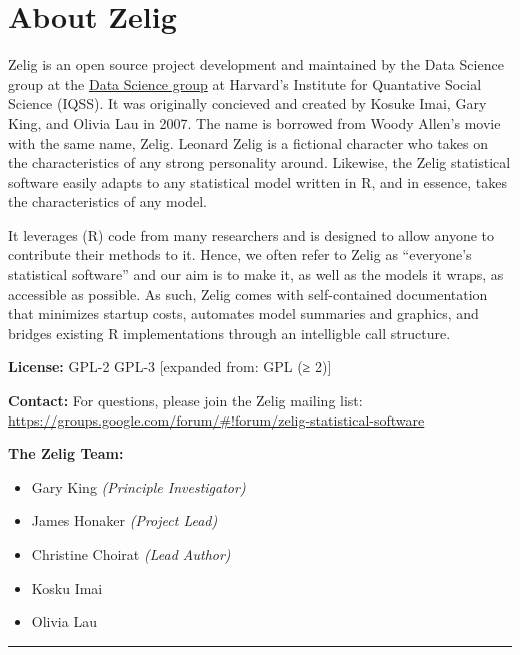 \documentclass[letterpaper,10pt,english]{sphinxmanual}
\begin{document}
\chapter{About Zelig}
\label{about:about}\label{about::doc}\label{about:about-zelig}
Zelig is an open source project development and maintained by the Data Science group at the \href{http://datascience.iq.harvard.edu/}{Data Science group} at Harvard's Institute for Quantative Social Science (IQSS). It was originally concieved and created by Kosuke Imai, Gary King, and Olivia Lau in 2007. The name is borrowed from Woody Allen's movie with the same name, Zelig. Leonard Zelig is a fictional character who takes on the characteristics of any strong personality around. Likewise, the Zelig statistical software easily adapts to any statistical model written in R, and in essence, takes the characteristics of any model.

It leverages (R) code from many researchers and is designed to allow anyone to contribute their methods to it. Hence, we often refer to Zelig as ``everyone's statistical software'' and our aim is to make it, as well as the models it wraps, as accessible as possible. As such, Zelig comes with self-contained documentation that minimizes startup costs, automates model summaries and graphics, and bridges existing R implementations through an intelligble call structure.

\textbf{License:} GPL-2 \textbar{} GPL-3 {[}expanded from: GPL (≥ 2){]}

\textbf{Contact:} For questions, please join the Zelig mailing list:
\href{https://groups.google.com/forum/\#!forum/zelig-statistical-software}{https://groups.google.com/forum/\#!forum/zelig-statistical-software}

\textbf{The Zelig Team:}
\begin{itemize}
\item {} 
Gary King \emph{(Principle Investigator)}

\item {} 
James Honaker \emph{(Project Lead)}

\item {} 
Christine Choirat \emph{(Lead Author)}

\item {} 
Kosku Imai

\item {} 
Olivia Lau

\end{itemize}


\bigskip\hrule{}\bigskip
\end{document}
